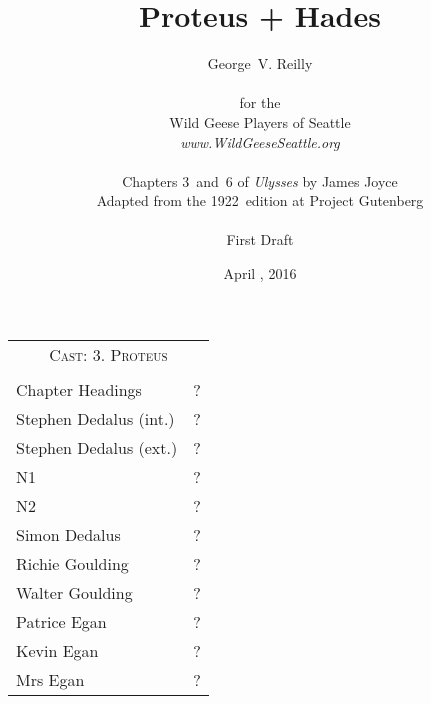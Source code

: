 



\title{\Huge Proteus + Hades}
\author{George~V. Reilly\\
\\
{\small for the}\\
Wild Geese Players of Seattle\\
{\emph{www.WildGeeseSeattle.org}}\\
\\
{\small Chapters 3~and~6 of \emph{Ulysses} by James Joyce}\\
{\small Adapted from the 1922~edition at Project Gutenberg}
\\
\\
{\small First Draft}}
\date{April , 2016}
\raggedbottom



\maketitle
\thispagestyle{empty}
\pagebreak

\begin{tabular}{lp{10cm}}
    \multicolumn{2}{c}{\Large \textsc{Cast: 3. Proteus}} \\
\\
Chapter Headings & ? \\
Stephen Dedalus (int.) & ? \\
Stephen Dedalus (ext.) & ? \\
N1  & ?\\
N2  & ?\\
Simon Dedalus  & ?\\
Richie Goulding  & ?\\
Walter Goulding  & ?\\
Patrice Egan  & ?\\
Kevin Egan  & ?\\
Mrs Egan  & ?\\
\end{tabular}

\bigskip
\bigskip
\bigskip

